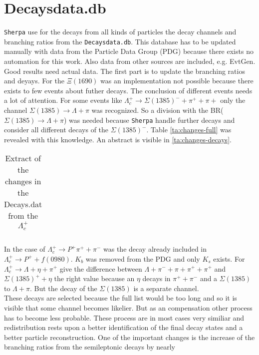 \section{Decaysdata.db}
\texttt{Sherpa} use for the decays from all kinds of particles the decay channels 
and branching ratios from the \texttt{Decaysdata.db}. This database has to be 
updated manually with data from the Particle Data Group (PDG) because there 
exists no automation for this work. Also data from other sources are included, 
e.g. EvtGen.\\
Good results need actual data. The first part is to update the branching ratios 
and deyays. For the \(\Xi(1690)\) was an implementation not possible because 
there exists to few events about futher decays. The conclusion of different events 
needs a lot of attention. For some events like \(\Lambda_c^+ \rightarrow  
\Sigma(1385)^- + \pi^+ + \pi+\) only the channel \(\Sigma(1385) \rightarrow 
\Lambda + \pi\) was recognized. So a division with the BR(\(\Sigma(1385) 
\rightarrow \Lambda + \pi\)) was needed because \texttt{Sherpa} handle further 
decays and consider all different decays of the \(\Sigma(1385)^-\). Table 
{\eqref{ta:changes-full}} was revealed with this knowledge. An abstract is 
visible in {\eqref{ta:changes-decays}}.
\begin{longtable}{| c | c | c | c |}
  \caption{Extract of the changes in the Decays.dat from the \(\Lambda_c^+\)}\label{ta:changes-decays}\\ 
  \hline
  
\end{longtable}
In the case of \(\Lambda_c^+ \rightarrow P^+ \pi^+ + \pi^-\) was the decay 
already included in \(\Lambda_c^+ \rightarrow P^+ + f(0980)\). \(K_b\) was 
removed from the PDG and only \(K_s\) exists. For \(\Lambda_c^+ \rightarrow 
\Lambda + \eta + \pi^+\) give the difference between \(\Lambda + \pi^- + 
\pi + \pi^+ + \pi^+\) and  \(\Sigma(1385)^+ + \eta\) the right value because 
an \(\eta\) decays in \(\pi^+ + \pi^-\) and a \(\Sigma(1385)\) to 
\(\Lambda + \pi\). But the decay of the \(\Sigma(1385)\) is a separate channel.\\
These decays are selected because the full list would be too long and so 
it is visible that some channel becomes likelier. But as an compensation other 
process has to become less probable. These process are in most cases very 
similiar and redistribution rests upon a better identification of the final 
decay states and a better particle reconstruction. One of the important changes 
is the increase of the branching ratios from the semileptonic decays by nearly 
